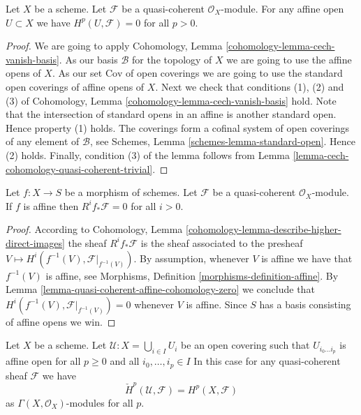 \begin{lemma}
\label{lemma-quasi-coherent-affine-cohomology-zero}
Let $X$ be a scheme.
Let $\mathcal{F}$ be a quasi-coherent $\mathcal{O}_X$-module.
For any affine open $U \subset X$ we have
$H^p(U, \mathcal{F}) = 0$ for all $p > 0$.
\end{lemma}

\begin{proof}
We are going to apply
Cohomology, Lemma \ref{cohomology-lemma-cech-vanish-basis}.
As our basis $\mathcal{B}$ for the topology of $X$ we are going to use
the affine opens of $X$.
As our set $\text{Cov}$ of open coverings we are going to use the standard
open coverings of affine opens of $X$.
Next we check that conditions (1), (2) and (3) of
Cohomology, Lemma \ref{cohomology-lemma-cech-vanish-basis}
hold. Note that the intersection of standard opens in an affine is
another standard open. Hence property (1) holds. 
The coverings form a cofinal system of open coverings of any element
of $\mathcal{B}$, see
Schemes, Lemma \ref{schemes-lemma-standard-open}.
Hence (2) holds.
Finally, condition (3) of the lemma follows from
Lemma \ref{lemma-cech-cohomology-quasi-coherent-trivial}.
\end{proof}

\begin{lemma}
\label{lemma-relative-affine-vanishing}
Let $f : X \to S$ be a morphism of schemes.
Let $\mathcal{F}$ be a quasi-coherent $\mathcal{O}_X$-module.
If $f$ is affine then $R^if_*\mathcal{F} = 0$ for all $i > 0$.
\end{lemma}

\begin{proof}
According to
Cohomology, Lemma \ref{cohomology-lemma-describe-higher-direct-images}
the sheaf
$R^if_*\mathcal{F}$ is the sheaf associated to the presheaf
$V \mapsto H^i(f^{-1}(V), \mathcal{F}|_{f^{-1}(V)})$.
By assumption, whenever $V$ is affine we have that $f^{-1}(V)$ is
affine, see Morphisms, Definition \ref{morphisms-definition-affine}.
By Lemma \ref{lemma-quasi-coherent-affine-cohomology-zero} we conclude that
$H^i(f^{-1}(V), \mathcal{F}|_{f^{-1}(V)}) = 0$
whenever $V$ is affine. Since $S$ has a basis consisting of affine
opens we win.
\end{proof}

\begin{lemma}
\label{lemma-cech-cohomology-quasi-coherent}
Let $X$ be a scheme.
Let $\mathcal{U} : X = \bigcup_{i \in I} U_i$ be an open covering such that
$U_{i_0 \ldots i_p}$ is affine open for all $p \ge 0$ and all
$i_0, \ldots, i_p \in I$
In this case for any quasi-coherent sheaf $\mathcal{F}$ we have
$$
\check{H}^p(\mathcal{U}, \mathcal{F}) = H^p(X, \mathcal{F})
$$
as $\Gamma(X, \mathcal{O}_X)$-modules for all $p$.
\end{lemma}

